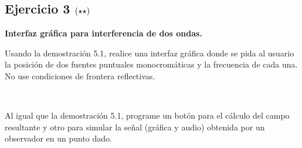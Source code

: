 \subsection*{Ejercicio 3 \large{$\left( \star\star \right)$}}

\textbf{Interfaz gráfica para interferencia de dos ondas.}

Usando la demostración 5.1, realice una interfaz gráfica donde se pida al 
usuario la posición de dos fuentes puntuales monocromáticas y la 
frecuencia de cada una. No use condiciones de frontera reflectivas.

\

Al igual que la demostración 5.1, programe un botón para el cálculo del 
campo resultante y otro para simular la señal (gráfica y audio) obtenida 
por un observador en un punto dado.


